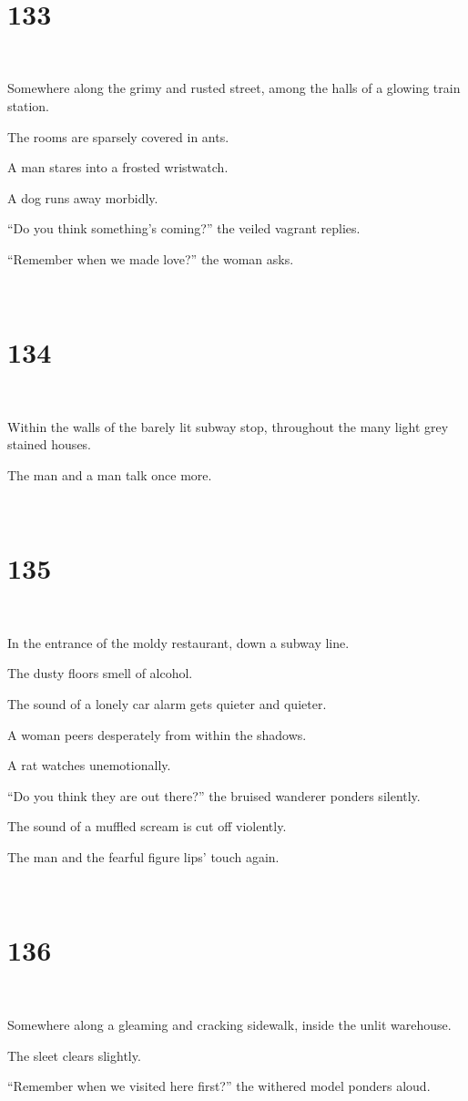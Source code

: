 \documentclass{report}
\begin{document}
~
\chapter*{133}
~

Somewhere along the grimy and rusted street, among the halls of a glowing train station.

The rooms are sparsely covered in ants.

A man stares into a frosted wristwatch.

A dog runs away morbidly.

``Do you think something's coming?'' the veiled vagrant replies.

``Remember when we made love?'' the woman asks.

~
\chapter*{134}
~

Within the walls of the barely lit subway stop, throughout the many light grey stained houses.

The man and a man talk once more.

~
\chapter*{135}
~

In the entrance of the moldy restaurant, down a subway line.

The dusty floors smell of alcohol.

The sound of a lonely car alarm gets quieter and quieter.

A woman peers desperately from within the shadows.

A rat watches unemotionally.

``Do you think they are out there?'' the bruised wanderer ponders silently.

The sound of a muffled scream is cut off violently.

The man and the fearful figure lips' touch again.

~
\chapter*{136}
~

Somewhere along a gleaming and cracking sidewalk, inside the unlit warehouse.

The sleet clears slightly.

``Remember when we visited here first?'' the withered model ponders aloud.
\end{document}
